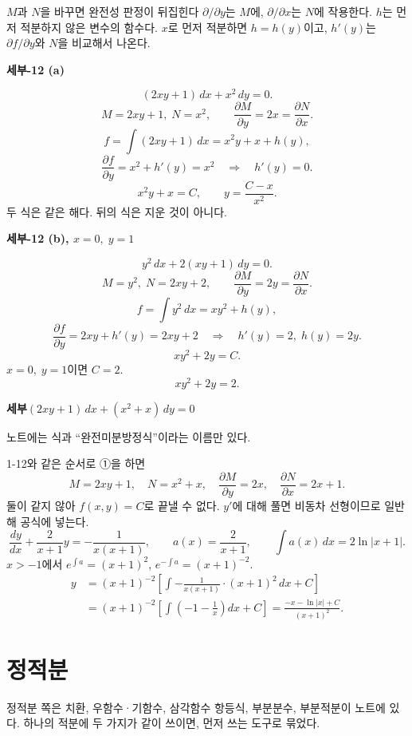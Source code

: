 \documentclass[11pt]{article}
\newcommand{\ex}[1]{\par\textbf{세부\quad #1}\par}
\begin{document}
\begin{confbox}{\(M\)과 \(N\)을 바꾸면 완전성 판정이 뒤집힌다}
\(\partial/\partial y\)는 \(M\)에, \(\partial/\partial x\)는 \(N\)에 작용한다. \(h\)는 먼저 적분하지 않은 변수의 함수다. \(x\)로 먼저 적분하면 \(h=h(y)\)이고, \(h'(y)\)는 \(\partial f/\partial y\)와 \(N\)을 비교해서 나온다.
\end{confbox}

\ex{1-12 (a)}
\[
(2xy+1)\,dx+x^{2}\,dy=0.
\]
\[
M=2xy+1,\; N=x^{2},\qquad
\frac{\partial M}{\partial y}=2x=\frac{\partial N}{\partial x}.
\]
\[
f=\int(2xy+1)\,dx=x^{2}y+x+h(y),
\]
\[
\frac{\partial f}{\partial y}=x^{2}+h'(y)=x^{2}
\quad\Rightarrow\quad h'(y)=0.
\]
\[
x^{2}y+x=C,\qquad y=\frac{C-x}{x^{2}}.
\]
두 식은 같은 해다. 뒤의 식은 지운 것이 아니다.

\ex{1-12 (b), \(x=0,\;y=1\)}
\[
y^{2}\,dx+2(xy+1)\,dy=0.
\]
\[
M=y^{2},\; N=2xy+2,\qquad
\frac{\partial M}{\partial y}=2y=\frac{\partial N}{\partial x}.
\]
\[
f=\int y^{2}\,dx=xy^{2}+h(y),
\]
\[
\frac{\partial f}{\partial y}=2xy+h'(y)=2xy+2
\quad\Rightarrow\quad h'(y)=2,\; h(y)=2y.
\]
\[
xy^{2}+2y=C.
\]
\(x=0,\;y=1\)이면 \(C=2\).
\[
xy^{2}+2y=2.
\]

\ex{\((2xy+1)\,dx+(x^{2}+x)\,dy=0\)}
노트에는 식과 ``완전미분방정식''이라는 이름만 있다.

\begin{fillbox}
1-12와 같은 순서로 ①을 하면
\[
M=2xy+1,\quad N=x^{2}+x,\quad
\frac{\partial M}{\partial y}=2x,\quad
\frac{\partial N}{\partial x}=2x+1.
\]
둘이 같지 않아 \(f(x,y)=C\)로 끝낼 수 없다. \(y'\)에 대해 풀면 비동차 선형이므로 일반해 공식에 넣는다.
\[
\frac{dy}{dx}+\frac{2}{x+1}y=-\frac{1}{x(x+1)},
\qquad
a(x)=\frac{2}{x+1},\qquad
\int a(x)\,dx=2\ln|x+1|.
\]
\(x>-1\)에서 \(e^{\int a}=(x+1)^{2}\), \(e^{-\int a}=(x+1)^{-2}\).
\begin{align*}
y&=(x+1)^{-2}
\left[\int -\frac{1}{x(x+1)}\cdot(x+1)^{2}\,dx+C\right]\\
&=(x+1)^{-2}
\left[\int\left(-1-\frac{1}{x}\right)dx+C\right]
=\frac{-x-\ln|x|+C}{(x+1)^{2}}.
\end{align*}
\end{fillbox}

\section{정적분}

정적분 쪽은 치환, 우함수·기함수, 삼각함수 항등식, 부분분수, 부분적분이 노트에 있다. 하나의 적분에 두 가지가 같이 쓰이면, 먼저 쓰는 도구로 묶었다.
\end{document}
